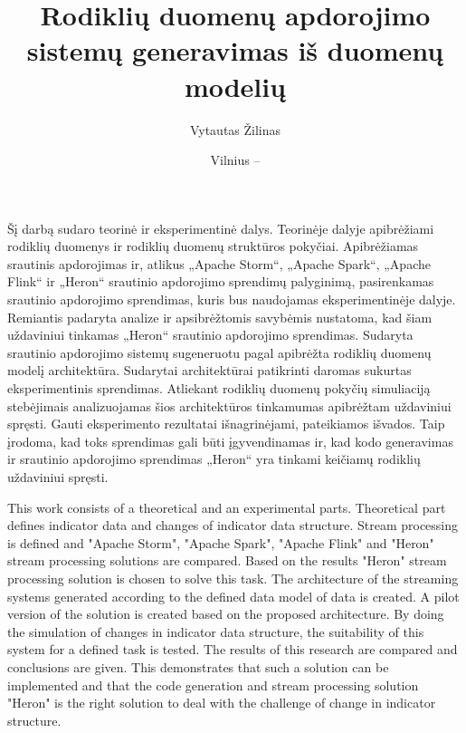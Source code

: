 \documentclass{VUMIFPSbakalaurinis}
\title{Rodiklių duomenų apdorojimo sistemų generavimas iš duomenų modelių}
\author{Vytautas Žilinas}
\date{Vilnius – \the\year}
\begin{document}
 
\maketitle

\cleardoublepage{}
\setcounter{page}{2}

Šį darbą sudaro teorinė ir eksperimentinė dalys. Teorinėje dalyje apibrėžiami rodiklių duomenys ir rodiklių duomenų struktūros pokyčiai. Apibrėžiamas srautinis apdorojimas ir, atlikus „Apache Storm“, „Apache Spark“, „Apache Flink“ ir „Heron“ srautinio apdorojimo sprendimų palyginimą, pasirenkamas srautinio apdorojimo sprendimas, kuris bus naudojamas eksperimentinėje dalyje. Remiantis padaryta analize ir apsibrėžtomis savybėmis nustatoma, kad šiam uždaviniui tinkamas „Heron“ srautinio apdorojimo sprendimas. Sudaryta srautinio apdorojimo sistemų sugeneruotu pagal apibrėžta rodiklių duomenų modelį architektūra. Sudarytai architektūrai patikrinti daromas sukurtas eksperimentinis sprendimas. Atliekant rodiklių duomenų pokyčių simuliaciją stebėjimais analizuojamas šios architektūros tinkamumas apibrėžtam uždaviniui spręsti. Gauti eksperimento rezultatai išnagrinėjami, pateikiamos išvados. Taip įrodoma, kad toks sprendimas gali būti įgyvendinamas ir, kad kodo generavimas ir srautinio apdorojimo sprendimas „Heron“ yra tinkami keičiamų rodiklių uždaviniui spręsti.

This work consists of a theoretical and an experimental parts. Theoretical part defines indicator data and changes of indicator data structure. Stream processing is defined and "Apache Storm", "Apache Spark", "Apache Flink" and "Heron" stream processing solutions are compared. Based on the results "Heron" stream processing solution is chosen to solve this task. The architecture of the streaming systems generated according to the defined data model of data is created. A pilot version of the solution is created based on the proposed architecture. By doing the simulation of changes in indicator data structure, the suitability of this system for a defined task is tested. The results of this research are compared and conclusions are given. This demonstrates that such a solution can be implemented and that the code generation and stream processing solution "Heron" is the right solution to deal with the challenge of change in indicator structure.
\end{document}
